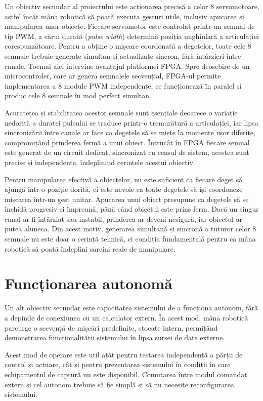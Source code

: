 Un obiectiv secundar al proiectului este acționarea precisă a celor 8
servomotoare, astfel încât mâna robotică să poată executa gesturi utile, inclusiv
apucarea și manipularea unor obiecte. Fiecare servomotor este controlat printr-un
semnal de tip PWM, a cărui durată (\textit{pulse width}) determină poziția
unghiulară a articulației corespunzătoare. Pentru a obține o mișcare coordonată a degetelor,
toate cele 8 semnale trebuie generate simultan și actualizate sincron, fără
întârzieri între canale. Tocmai aici intervine avantajul platformei FPGA. Spre
deosebire de un microcontroler, care ar genera semnalele secvențial, FPGA-ul
permite implementarea a 8 module PWM independente, ce funcționează în paralel și
produc cele 8 semnale în mod perfect simultan.

Acuratețea și stabilitatea acestor semnale sunt esențiale deoarece o variație nedorită a
duratei pulsului se traduce printr-o tremurătură a articulației, iar lipsa
sincronizării între canale ar face ca degetele să se miște la momente ușor
diferite, compromițând prinderea fermă a unui obiect. Întrucât în FPGA fiecare
semnal este generat de un circuit dedicat, sincronizat cu ceasul de sistem,
acestea sunt precise și independente, îndeplinind cerințele acestui obiectiv.

Pentru manipularea efectivă a obiectelor, nu este suficient ca fiecare deget să
ajungă într-o poziție dorită, ci este nevoie ca toate degetele să își coordoneze
mișcarea într-un gest unitar. Apucarea unui obiect presupune ca degetele să se
închidă progresiv și împreună, până când obiectul este prins ferm. Dacă un singur
canal ar fi întârziat sau instabil, prinderea ar deveni nesigură, iar obiectul ar
putea aluneca. Din acest motiv, generarea simultană și sincronă a tuturor celor 8
semnale nu este doar o cerință tehnică, ci condiția fundamentală pentru ca mâna
robotică să poată îndeplini sarcini reale de manipulare.

\section{Funcționarea autonomă}
\label{sec:obj-autonom}

Un alt obiectiv secundar este capacitatea sistemului de a funcționa autonom, fără
a depinde de conexiunea cu un calculator extern. În acest mod, mâna robotică
parcurge o secvență de mișcări predefinite, stocate intern, permițând
demonstrarea funcționalității sistemului în lipsa sursei de date externe.

Acest mod de operare este util atât pentru testarea independentă a părții de
control și actuare, cât și pentru prezentarea sistemului în condiții în care
echipamentul de captură nu este disponibil. Comutarea între modul comandat extern
și cel autonom trebuie să fie simplă și să nu necesite reconfigurarea sistemului.


